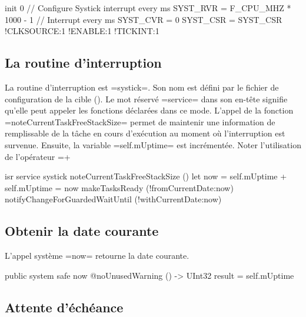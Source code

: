 \begin{PLM}
init 0 { // Configure Systick interrupt every ms
  SYST_RVR = F_CPU_MHZ * 1000 - 1 // Interrupt every ms
  SYST_CVR = 0
  SYST_CSR = {SYST_CSR !CLKSOURCE:1 !ENABLE:1 !TICKINT:1}
}
\end{PLM}


\subsection{La routine d'interruption}

La routine d'interruption est \plm=systick=. Son nom est défini par le fichier de configuration de la cible (). Le mot réservé \plm=service= dans son en-tête signifie qu'elle peut appeler les fonctions déclarées dans ce mode. L'appel de la fonction \plm=noteCurrentTaskFreeStackSize= permet de maintenir une information de remplissable de la tâche en cours d'exécution au moment où l'interruption est survenue. Ensuite, la variable \plm=self.mUptime= est incrémentée. Noter l'utilisation de l'opérateur \plm=+%

\begin{PLM}
isr service systick {
  noteCurrentTaskFreeStackSize ()
  let now = self.mUptime +%
  self.mUptime = now
  makeTasksReady (!fromCurrentDate:now)
  notifyChangeForGuardedWaitUntil (!withCurrentDate:now)
}
\end{PLM}




\subsection{Obtenir la date courante}

L'appel système \plm=now= retourne la date courante.

\begin{PLM}
public system safe now @noUnusedWarning () -> UInt32 {
  result = self.mUptime
}
\end{PLM}



\subsection{Attente d'échéance}

